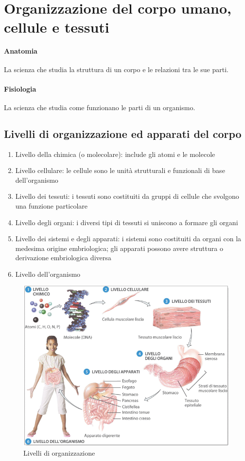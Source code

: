 \documentclass[a4paper]{article}
\begin{document}
\section{Organizzazione del corpo umano, cellule e tessuti}
\paragraph{Anatomia} La scienza che studia la struttura di un corpo e le 
relazioni tra le sue parti.
\paragraph{Fisiologia} La scienza che studia come funzionano le parti di un
organismo.
\subsection{Livelli di organizzazione ed apparati del corpo}
\begin{enumerate}
    \item Livello della chimica (o molecolare): include gli atomi e le molecole
    \item Livello cellulare: le cellule sono le unità strutturali e funzionali 
    di base dell’organismo
    \item Livello dei tessuti: i tessuti sono costituiti da gruppi di cellule 
    che svolgono una funzione particolare
    \item Livello degli organi: i diversi tipi di tessuti si uniscono a formare 
    gli organi
    \item Livello dei sistemi e degli apparati: i sistemi sono costituiti da 
    organi con la medesima origine embriologica; gli apparati possono avere 
    struttura o derivazione embriologica diversa
    \item Livello dell’organismo
\end{enumerate}
\begin{figure}[H]
    \centering
    \includegraphics[scale=0.3]{figures/levels.png}
    \caption{Livelli di organizzazione}
\end{figure}
\end{document}
